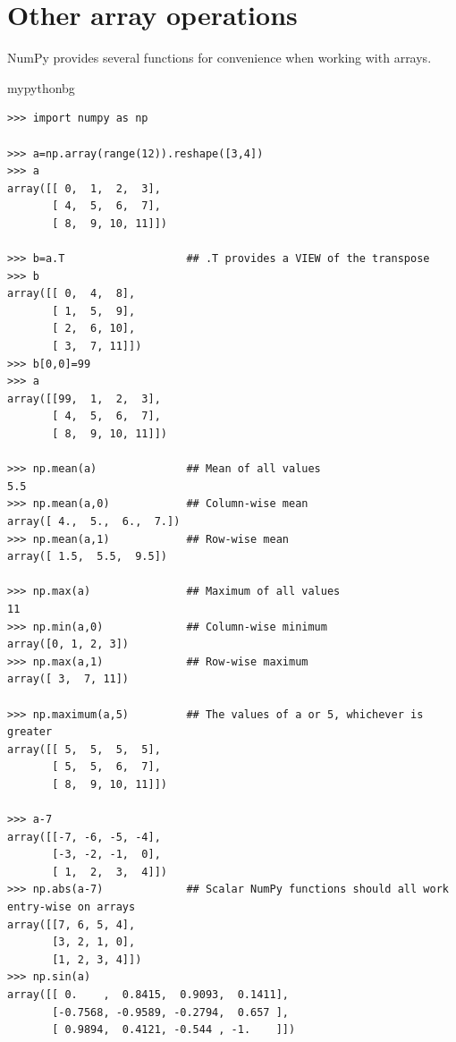 \section{Other array operations}
NumPy provides several functions for convenience when working with arrays.
\begin{tsession}{mypythonbg}
\begin{verbatim}
>>> import numpy as np

>>> a=np.array(range(12)).reshape([3,4])
>>> a
array([[ 0,  1,  2,  3],
       [ 4,  5,  6,  7],
       [ 8,  9, 10, 11]])

>>> b=a.T                   ## .T provides a VIEW of the transpose
>>> b
array([[ 0,  4,  8],
       [ 1,  5,  9],
       [ 2,  6, 10],
       [ 3,  7, 11]])
>>> b[0,0]=99
>>> a
array([[99,  1,  2,  3],
       [ 4,  5,  6,  7],
       [ 8,  9, 10, 11]])

>>> np.mean(a)              ## Mean of all values
5.5
>>> np.mean(a,0)            ## Column-wise mean
array([ 4.,  5.,  6.,  7.])
>>> np.mean(a,1)            ## Row-wise mean
array([ 1.5,  5.5,  9.5])

>>> np.max(a)               ## Maximum of all values
11
>>> np.min(a,0)             ## Column-wise minimum
array([0, 1, 2, 3])
>>> np.max(a,1)             ## Row-wise maximum
array([ 3,  7, 11])

>>> np.maximum(a,5)         ## The values of a or 5, whichever is greater
array([[ 5,  5,  5,  5],
       [ 5,  5,  6,  7],
       [ 8,  9, 10, 11]])

>>> a-7
array([[-7, -6, -5, -4],
       [-3, -2, -1,  0],
       [ 1,  2,  3,  4]])
>>> np.abs(a-7)             ## Scalar NumPy functions should all work entry-wise on arrays
array([[7, 6, 5, 4],
       [3, 2, 1, 0],
       [1, 2, 3, 4]])
>>> np.sin(a)
array([[ 0.    ,  0.8415,  0.9093,  0.1411],
       [-0.7568, -0.9589, -0.2794,  0.657 ],
       [ 0.9894,  0.4121, -0.544 , -1.    ]])
\end{verbatim}
\end{tsession}

